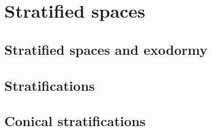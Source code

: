 \chapter{Stratified spaces}

\section{Stratified spaces and exodormy}

\section{Stratifications}

\section{Conical stratifications}


